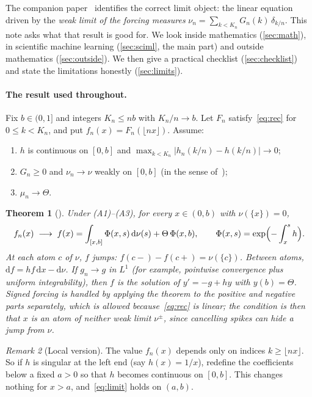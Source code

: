 \documentclass[11pt]{article}
\theoremstyle{plain}
\newtheorem{theorem}{Theorem}
\theoremstyle{remark}
\newtheorem{remark}[theorem]{Remark}
\newcommand{\dd}{\mathrm{d}}
\begin{document}
The companion paper~\cite[Theorem~4]{companion} identifies the correct limit object: the
linear equation driven by the \emph{weak limit of the forcing measures}
$\nu_n=\sum_{k<K_n}G_n(k)\,\delta_{k/n}$. This note asks what that result is good for.
We look inside mathematics (\cref{sec:math}), in scientific machine learning
(\cref{sec:sciml}, the main part) and outside mathematics (\cref{sec:outside}). We then
give a practical checklist (\cref{sec:checklist}) and state the limitations honestly
(\cref{sec:limits}).



\paragraph{The result used throughout.}
Fix $b\in(0,1]$ and integers $K_n\le nb$ with $K_n/n\to b$. Let $F_n$ satisfy~\eqref{eq:rec}
for $0\le k<K_n$, and put $f_n(x)=F_n(\lfloor nx\rfloor)$. Assume:
\begin{enumerate}[label=(A\arabic*),leftmargin=3em]
  \item $h$ is continuous on $[0,b]$ and $\max_{k<K_n}|h_n(k/n)-h(k/n)|\to0$;
  \item $G_n\ge0$ and $\nu_n\to\nu$ weakly on $[0,b]$ (in the sense of~\cite{billingsley});
  \item $\mu_n\to\Theta$.
\end{enumerate}

\begin{theorem}[{\cite[Theorem~4]{companion}}]\label{thm:main}
Under \textup{(A1)--(A3)}, for every $x\in(0,b)$ with $\nu(\{x\})=0$,
\begin{equation}\label{eq:limit}
  f_n(x)\;\longrightarrow\; f(x)=\int_{[x,b]}\Phi(x,s)\,\dd\nu(s)+\Theta\,\Phi(x,b),
  \qquad \Phi(x,s)=\exp\Bigl(-\int_x^s h\Bigr).
\end{equation}
At each atom $c$ of $\nu$, $f$ jumps: $f(c-)-f(c+)=\nu(\{c\})$. Between atoms,
$\dd f=hf\,\dd x-\dd\nu$. If $g_n\to g$ in $L^1$ (for example, pointwise convergence plus
uniform integrability), then $f$ is the solution of $y'=-g+hy$ with $y(b)=\Theta$.
Signed forcing is handled by applying the theorem to the positive and negative parts
separately, which is allowed because~\eqref{eq:rec} is linear; the condition is then that $x$ is
an atom of neither weak limit $\nu^{\pm}$, since cancelling spikes can hide a jump from $\nu$.
\end{theorem}

\begin{remark}[Local version]\label{rem:local}
The value $f_n(x)$ depends only on indices $k\ge\lfloor nx\rfloor$. So if $h$ is singular
at the left end (say $h(x)=1/x$), redefine the coefficients below a fixed $a>0$ so that
$h$ becomes continuous on $[0,b]$. This changes nothing for $x>a$, and~\eqref{eq:limit}
holds on $(a,b)$.
\end{remark}
\end{document}
